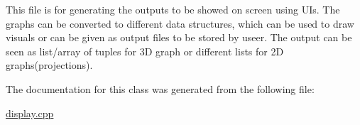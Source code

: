 This file is for generating the outputs to be showed on screen using U\+Is. The graphs can be converted to different data structures, which can be used to draw visuals or can be given as output files to be stored by useer. The output can be seen as list/array of tuples for 3D graph or different lists for 2D graphs(projections).

The documentation for this class was generated from the following file\+:\begin{DoxyCompactItemize}
\item 
\hyperlink{display_8cpp}{display.\+cpp}\end{DoxyCompactItemize}
